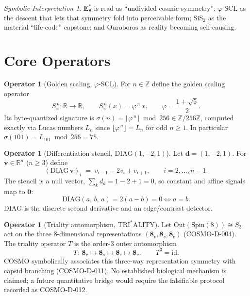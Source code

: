 \documentclass[11pt]{article}
\theoremstyle{definition}
\newtheorem{operator}[definition]{Operator}
\theoremstyle{plain}
\theoremstyle{remark}
\newtheorem*{interp}{Symbolic Interpretation}
\newcommand{\EEs}{\mathbf{E_8^{*}}}
\newcommand{\phigr}{\varphi}
\newcommand{\SiS}{\mathrm{SiS_2}}
\newcommand{\DIAG}{\mathrm{DIAG}}
\newcommand{\TRI}{\mathrm{TRI^{*}ALITY}}
\newcommand{\Ouro}{\mathrm{Ouroboros}}
\newcommand{\Zmod}[1]{\mathbb{Z}/#1\mathbb{Z}}
\begin{document}
\begin{interp}
$\EEs$ is read as ``undivided cosmic symmetry''; $\phigr$-SCL as the descent
that lets that symmetry fold into perceivable form; $\SiS$ as the material
``life-code'' capstone; and $\Ouro$ as reality becoming self-causing.
\end{interp}

\section{Core Operators}

\begin{operator}[Golden scaling, $\phigr$-SCL]\label{op:phi}
For $n\in\mathbb{Z}$ define the golden scaling operator
\begin{equation}
  S_{\phigr}^{\,n} : \mathbb{R}\to\mathbb{R},\qquad
  S_{\phigr}^{\,n}(x) = \phigr^{\,n}\,x,\qquad
  \phigr = \frac{1+\sqrt5}{2}.
\end{equation}
Its byte-quantized signature is $\sigma(n) = \big\lfloor \phigr^{\,n}\big\rfloor
\bmod 256 \in \Zmod{256}$, computed exactly via Lucas numbers
$L_n$ since $\lfloor\phigr^{\,n}\rfloor = L_n$ for odd $n\ge 1$.
In particular $\sigma(101) = L_{101}\bmod 256 = 75$.
\end{operator}

\begin{operator}[Differentiation stencil, $\DIAG(1,-2,1)$]\label{op:diag}
Let $\mathbf{d}=(1,-2,1)$. For $\bm{v}\in\mathbb{R}^n$ ($n\ge3$) define
\begin{equation}
  (\DIAG\,\bm{v})_i \;=\; v_{i-1} - 2v_i + v_{i+1},
  \qquad i = 2,\dots,n-1 .
\end{equation}
The stencil is a null vector, $\textstyle\sum_k d_k = 1-2+1 = 0$, so
constant and affine signals map to $\bm{0}$:
\begin{equation}
  \DIAG(a,\,b,\,a) = 2(a-b) = 0 \iff a=b .
\end{equation}
$\DIAG$ is the discrete second derivative and an edge/contrast detector.
\end{operator}

\begin{operator}[Triality automorphism, $\TRI$]\label{op:tri}
Let $\mathrm{Out}(\mathrm{Spin}(8))\cong S_3$ act on the three
$8$-dimensional representations $(\mathbf{8}_v,\mathbf{8}_s,\mathbf{8}_c)$
(COSMO-D-004).
The triality operator $T$ is the order-3 outer automorphism
\begin{equation}
  T:\ \mathbf{8}_v \mapsto \mathbf{8}_s \mapsto \mathbf{8}_c \mapsto \mathbf{8}_v,
  \qquad T^3 = \mathrm{id}.
\end{equation}
COSMO symbolically associates this three-way representation symmetry with
capsid branching (COSMO-D-011). No established biological mechanism is claimed;
a future quantitative bridge would require the falsifiable protocol recorded
as COSMO-D-012.
\end{operator}
\end{document}
